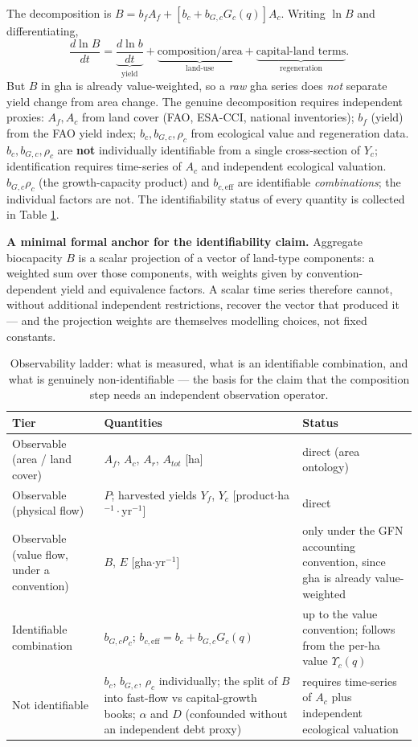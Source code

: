 \documentclass[11pt]{article}
\begin{document}
The decomposition is $B=b_fA_f+[b_c+b_{G,c}G_c(q)]A_c$. Writing $\ln B$ and differentiating,
\[
\frac{d\ln B}{dt}=\underbrace{\frac{d\ln b}{dt}}_{\text{yield}}+\underbrace{\text{composition/area}}_{\text{land-use}}+\underbrace{\text{capital-land terms}}_{\text{regeneration}}.
\]
But $B$ in gha is already value-weighted, so a \emph{raw} gha series does \emph{not} separate yield change from area change. The genuine decomposition requires independent proxies: $A_f,A_c$ from land cover (FAO, ESA-CCI, national inventories); $b_f$ (yield) from the FAO yield index; $b_c,b_{G,c},\rho_c$ from ecological value and regeneration data. $b_c,b_{G,c},\rho_c$ are \textbf{not} individually identifiable from a single cross-section of $Y_c$; identification requires time-series of $A_c$ and independent ecological valuation. $b_{G,c}\rho_c$ (the growth-capacity product) and $b_{c,\mathrm{eff}}$ are identifiable \emph{combinations}; the individual factors are not. The identifiability status of every quantity is collected in Table \ref{tab:ladder}.

\noindent\textbf{A minimal formal anchor for the identifiability claim.} Aggregate biocapacity $B$ is a scalar projection of a vector of land-type components: a weighted sum over those components, with weights given by convention-dependent yield and equivalence factors. A scalar time series therefore cannot, without additional independent restrictions, recover the vector that produced it --- and the projection weights are themselves modelling choices, not fixed constants.

\begin{table}[htbp]
\centering
\small
\begin{tabularx}{\textwidth}{>{\raggedright\arraybackslash}X>{\raggedright\arraybackslash}X>{\raggedright\arraybackslash}X}
\toprule
Tier & Quantities & Status \\
\midrule
Observable (area / land cover) & $A_f$, $A_c$, $A_r$, $A_{tot}$ [ha] & direct (area ontology) \\
Observable (physical flow) & $P$; harvested yields $Y_f$, $Y_c$ [product$\cdot$ha$^{-1}\cdot$yr$^{-1}$] & direct \\
Observable (value flow, under a convention) & $B$, $E$ [gha$\cdot$yr$^{-1}$] & only under the GFN accounting convention, since gha is already value-weighted \\
Identifiable combination & $b_{G,c}\rho_c$; $b_{c,\mathrm{eff}}=b_c+b_{G,c}G_c(q)$ & up to the value convention; follows from the per-ha value $\Upsilon_c(q)$ \\
Not identifiable & $b_c$, $b_{G,c}$, $\rho_c$ individually; the split of $B$ into fast-flow vs capital-growth books; $\alpha$ and $D$ (confounded without an independent debt proxy) & requires time-series of $A_c$ plus independent ecological valuation \\
\bottomrule
\end{tabularx}
\caption{Observability ladder: what is measured, what is an identifiable combination, and what is genuinely
non-identifiable --- the basis for the claim that the composition step needs an independent observation operator.}
\label{tab:ladder}
\end{table}
\end{document}
